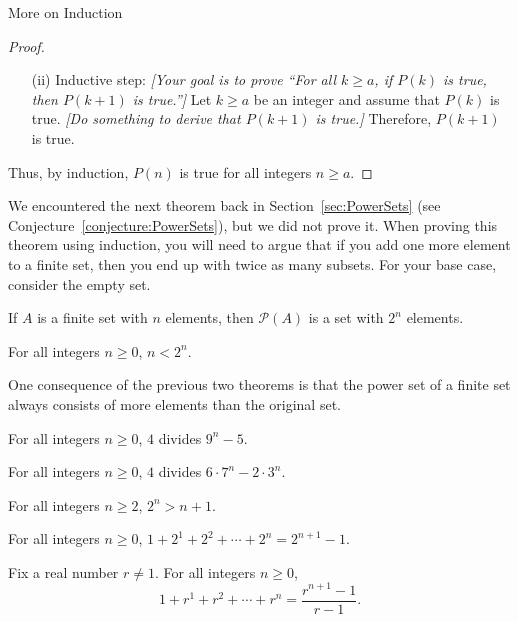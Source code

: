 \begin{section}{More on Induction}
\begin{skeleton}
\begin{mdframed}[style=skeleton]
\begin{proof}
\begin{enumerate}
\item[(ii)] Inductive step:  \emph{[Your goal is to prove ``For all $k\geq a$, if $P(k)$ is true, then $P(k+1)$ is true.'']} Let $k \geq a$ be an integer and assume that $P(k)$ is true. \emph{[Do something to derive that $P(k+1)$ is true.]} Therefore, $P(k+1)$ is true.
\end{enumerate}
Thus, by induction, $P(n)$ is true for all integers $n \ge a$.
\end{proof}
\end{mdframed}
\end{skeleton}

We encountered the next theorem back in Section~\ref{sec:PowerSets} (see Conjecture~\ref{conjecture:PowerSets}), but we did not prove it. When proving this theorem using induction, you will need to argue that if you add one more element to a finite set, then you end up with twice as many subsets. For your base case, consider the empty set.

\begin{theorem}\label{thm:size of power set for finite sets}
If $A$ is a finite set with $n$ elements, then $\mathcal{P}(A)$ is a set with $2^{n}$ elements.
\end{theorem}

\begin{theorem}\label{thm:n<2^n}
For all integers $n \ge 0$, $n<2^n$.
\end{theorem}

One consequence of the previous two theorems is that the power set of a finite set always consists of more elements than the original set.

\begin{theorem}
For all integers $n \ge 0$, $4$ divides $9^n - 5$.
\end{theorem}

\begin{theorem}
For all integers $n \ge 0$, $4$ divides $6\cdot 7^n - 2 \cdot 3^n$.
\end{theorem}

\begin{theorem}
For all integers $n \ge 2$, $2^n > n + 1$.
\end{theorem}

\begin{theorem}
For all integers $n \ge 0$, $1 + 2^1 + 2^2 + \cdots + 2^n = 2^{n+1} - 1$.
\end{theorem}

\begin{theorem}
Fix a real number $r \neq 1$. For all integers $n \ge 0$,
$$\displaystyle{1 + r^1 + r^2 + \cdots + r^n = \frac{r^{n+1} - 1}{r-1}}.$$
\end{theorem}


\end{section}
